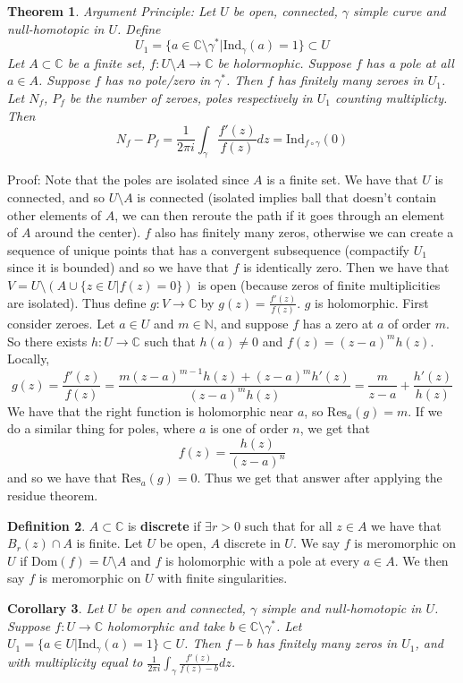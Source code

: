 \documentclass[11pt]{article}
\theoremstyle{plain}
\newtheorem{theorem}{Theorem}[section]
\newtheorem{corollary}[theorem]{Corollary}
\theoremstyle{definition}
\newtheorem{definition}[theorem]{Definition}
\newcommand{\C}{\mathbb{C}}
\newcommand{\Ind}{\text{Ind}}
\newcommand{\Res}{\text{Res}}
\begin{document}
\begin{theorem}
Argument Principle: Let $U$ be open, connected, $\gamma$ simple curve and null-homotopic in $U$. Define 
$$U_1 = \{ a \in \C \setminus \gamma^* | \Ind_\gamma(a) = 1\} \subset U$$
Let $A \subset \C$ be a finite set, $f:U \setminus A \to \C$ be holormophic. Suppose $f$ has a pole at all $a \in A$. Suppose $f$ has no pole/zero in $\gamma^*$. Then $f$ has finitely many zeroes in $U_1$. Let $N_f$, $P_f$ be the number of zeroes, poles respectively in $U_1$ counting multiplicty. Then 
$$ N_f - P_f = \frac{1}{2\pi i} \int_\gamma \frac{f'(z)}{f(z)} dz = \Ind_{f \circ \gamma}(0) $$
\end{theorem}

Proof: Note that the poles are isolated since $A$ is a finite set. We have that $U$ is connected, and so $U \setminus A$ is connected (isolated implies ball that doesn't contain other elements of $A$, we can then reroute the path if it goes through an element of $A$ around the center). $f$ also has finitely many zeros, otherwise we can create a sequence of unique points that has a convergent subsequence (compactify $U_1$ since it is bounded) and so we have that $f$ is identically zero. Then we have that $V = U \setminus (A \cup \{ z \in U | f(z) = 0 \})$ is open (because zeros of finite multiplicities are isolated). Thus define $g:V \to \C$ by $g(z) = \frac{f'(z)}{f(z)}$. $g$ is holomorphic. First consider zeroes. Let $a \in U$ and $m \in \mathbb{N}$, and suppose $f$ has a zero at $a$ of order $m$. So there exists $h: U \to \C$ such that $h(a) \neq 0$ and $f(z) = (z-a)^mh(z)$. Locally, 
$$ g(z) = \frac{f'(z)}{f(z)} = \frac{m(z-a)^{m-1}h(z) + (z-a)^mh'(z)}{(z-a)^mh(z)} = \frac{m}{z-a} + \frac{h'(z)}{h(z)} $$
We have that the right function is holomorphic near $a$, so $\Res_a(g) = m$. If we do a similar thing for poles, where $a$ is one of order $n$, we get that 
$$ f(z) = \frac{h(z)}{(z-a)^n} $$
and so we have that $\Res_a(g) = 0$. Thus we get that answer after applying the residue theorem. 

\begin{definition}
$A \subset \C$ is \textbf{discrete} if $\exists r > 0$ such that for all $z \in A$ we have that $B_r(z) \cap A$ is finite. Let $U$ be open, $A$ discrete in $U$. We say $f$ is meromorphic on $U$ if $\text{Dom}(f) = U \setminus A$ and $f$ is holomorphic with a pole at every $a \in A$. We then say $f$ is meromorphic on $U$ with finite singularities. 
\end{definition}

\begin{corollary} 
Let $U$ be open and connected, $\gamma$ simple and null-homotopic in $U$. Suppose $f: U \to \C$ holomorphic and take $b \in \C \setminus \gamma^*$. Let $U_1 = \{ a \in U | \Ind_\gamma(a) = 1\} \subset U$. Then $f-b$ has finitely many zeros in $U_1$, and with multiplicity equal to $\frac{1}{2\pi i} \int_\gamma \frac{f'(z)}{f(z) -b} dz$.
\end{corollary}
\end{document}

